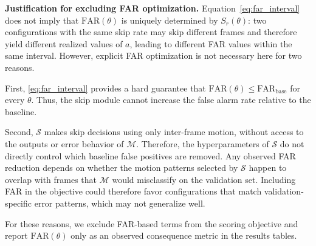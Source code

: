 \textbf{Justification for excluding FAR optimization.}
Equation~\eqref{eq:far_interval} does not imply that $\mathrm{FAR}(\theta)$
is uniquely determined by $S_r(\theta)$: two configurations with the same
skip rate may skip different frames and therefore yield different realized
values of $a$, leading to different FAR values within the same interval.
However, explicit FAR optimization is not necessary here for two reasons.

First, \eqref{eq:far_interval} provides a hard guarantee that
$\mathrm{FAR}(\theta) \leq \mathrm{FAR}_{\text{base}}$ for every $\theta$.
Thus, the skip module cannot increase the false alarm rate relative to the
baseline.

Second, $\mathcal{S}$ makes skip decisions using only inter-frame motion,
without access to the outputs or error behavior of $\mathcal{M}$.
Therefore, the hyperparameters of $\mathcal{S}$ do not directly control
which baseline false positives are removed.
Any observed FAR reduction depends on whether the motion patterns selected
by $\mathcal{S}$ happen to overlap with frames that $\mathcal{M}$ would
misclassify on the validation set.
Including FAR in the objective could therefore favor configurations that
match validation-specific error patterns, which may not generalize well.

For these reasons, we exclude FAR-based terms from the scoring objective
and report $\mathrm{FAR}(\theta)$ only as an observed consequence metric
in the results tables.